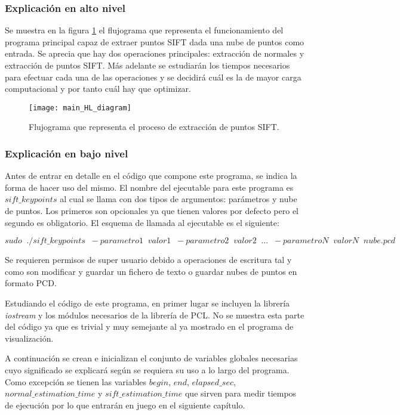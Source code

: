\subsubsection{Explicación en alto nivel}
Se muestra en la figura \ref{fig:main_HL_diagram} el flujograma que representa el funcionamiento del programa principal capaz de extraer puntos SIFT dada una nube de puntos como entrada. Se aprecia que hay dos operaciones principales: extracción de normales y extracción de puntos SIFT. Más adelante se estudiarán los tiempos necesarios para efectuar cada una de las operaciones y se decidirá cuál es la de mayor carga computacional y por tanto cuál hay que optimizar.

\begin{figure}
\centering
\texttt{[image: main\_HL\_diagram]}
\caption{Flujograma que representa el proceso de extracción de puntos SIFT.}\label{fig:main_HL_diagram}
\end{figure}

\subsubsection{Explicación en bajo nivel}
Antes de entrar en detalle en el código que compone este programa, se indica la forma de hacer uso del mismo. 
El nombre del ejecutable para este programa es $sift\_keypoints$ al cual se llama con dos tipos de argumentos: parámetros y nube de puntos. Los primeros son opcionales ya que tienen valores por defecto pero el segundo es obligatorio. El esquema de llamada al ejecutable es el siguiente:

$$sudo \;\; ./sift\_keypoints \;\; -parametro1 \;\; valor1 \;\; -parametro2 \;\; valor2 \;\; ... \;\; -parametroN \;\; valorN \;\; nube.pcd$$

Se requieren permisos de super usuario debido a operaciones de escritura tal y como son modificar y guardar un fichero de texto o guardar nubes de puntos en formato PCD.


Estudiando el código de este programa, en primer lugar se incluyen la librería \textit{iostream} y los módulos necesarios de la librería de PCL. No se muestra esta parte del código ya que es trivial y muy semejante al ya mostrado en el programa de visualización.

A continuación se crean e inicializan el conjunto de variables globales necesarias cuyo significado se explicará según se requiera su uso a lo largo del programa. Como excepción se tienen las variables $begin$, $end$, $elapsed\_sec$, $normal\_estimation\_time$ y $sift\_estimation\_time$ que sirven para medir tiempos de ejecución por lo que entrarán en juego en el siguiente capítulo.

